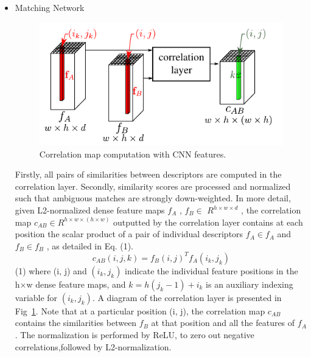 \documentclass[12pt, a4paper,twoside]{article}
\begin{document}
\begin{itemize}
  \item Matching Network

\begin{figure}[htbp]
\centering
\includegraphics[scale=0.5]{images/Coreraltion}
\caption{ Correlation map computation with CNN features.
}\label{fig:figure4}
\end{figure} 

	Firstly, all pairs of similarities between descriptors are computed in the correlation layer. Secondly, similarity scores are processed and normalized such that ambiguous matches are strongly down-weighted. In more detail, given L2-normalized dense feature maps $f_{A}$ , $f_{B}$$ \in$ $R^{h\times w \times d}$ , the correlation map $c_{AB} \in$$R^{h\times w\times (h\times w)}$ outputted by the correlation layer contains at each position the scalar product of a pair of individual descriptors $f_{A} \in f_{A}$ and $f_{B} \in f_{B}$ , as detailed in Eq. (1).
	\begin{equation}
		c_{AB} (i,j,k)= f_{B} (i, j)^{T} f_{A}(i_{k}, j_{k})
        \label{eq1}
    \end{equation}
	(1) where (i, j) and $(i_{k} , j_{k} )$ indicate the individual feature positions in the h×w dense feature maps, and $k = h(j_{k} - 1)+i_{k}$ is an auxiliary indexing variable for $(i_{k} , j_{k} )$. A diagram of the correlation layer is presented in Fig~\ref{fig:figure4}. Note that at a particular position (i, j), the correlation map $c_{AB}$ contains the similarities between $f_{B}$ at that position and all the features of $f_{A}$. The normalization is performed by ReLU, to zero out negative correlations,followed by L2-normalization.

\end{itemize}
\end{document}
